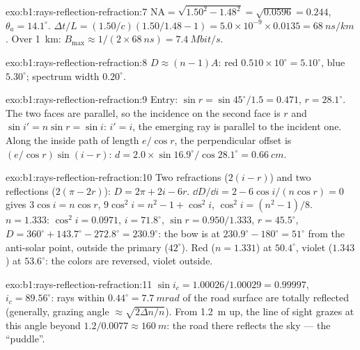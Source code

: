 \begin{solution}{exo:b1:rays-reflection-refraction:7}
$\mathrm{NA} = \sqrt{1.50^2 - 1.48^2} = \sqrt{0.0596} = 0.244$,
$\theta_a = 14.1^\circ$. $\Delta t/L = (1.50/c)(1.50/1.48 - 1) =
5.0\times10^{-9} \times 0.0135 = \qty{68}{ns/km}$. Over \qty{1}{km}:
$B_{\max} \approx 1/(2 \times \qty{68}{ns}) = \qty{7.4}{Mbit/s}$.
\end{solution}

\begin{solution}{exo:b1:rays-reflection-refraction:8}
$D \approx (n - 1)A$: red $0.510 \times 10^\circ = 5.10^\circ$, blue
$5.30^\circ$; spectrum width $0.20^\circ$.
\end{solution}

\begin{solution}{exo:b1:rays-reflection-refraction:9}
Entry: $\sin r = \sin 45^\circ/1.5 = 0.471$, $r = 28.1^\circ$. The two
faces are parallel, so the incidence on the second face is $r$ and
$\sin i' = n\sin r = \sin i$: $i' = i$, the emerging ray is parallel to
the incident one. Along the inside path of length $e/\cos r$, the
perpendicular offset is $(e/\cos r)\sin(i - r)$:
$d = 2.0 \times \sin 16.9^\circ/\cos 28.1^\circ = \qty{0.66}{cm}$.
\end{solution}

\begin{solution}{exo:b1:rays-reflection-refraction:10}
Two refractions ($2(i - r)$) and two reflections ($2(\pi - 2r)$):
$D = 2\pi + 2i - 6r$. $\dd D/\dd i = 2 - 6\cos i/(n\cos r) = 0$ gives
$3\cos i = n\cos r$, $9\cos^2 i = n^2 - 1 + \cos^2 i$, $\cos^2 i =
(n^2 - 1)/8$. $n = 1.333$: $\cos^2 i = 0.0971$, $i = 71.8^\circ$,
$\sin r = 0.950/1.333$, $r = 45.5^\circ$, $D = 360^\circ + 143.7^\circ -
272.8^\circ = 230.9^\circ$: the bow is at $230.9^\circ - 180^\circ =
51^\circ$ from the anti-solar point, outside the primary ($42^\circ$).
Red ($n = 1.331$) at $50.4^\circ$, violet ($1.343$) at $53.6^\circ$:
the colors are reversed, violet outside.
\end{solution}

\begin{solution}{exo:b1:rays-reflection-refraction:11}
$\sin i_c = 1.00026/1.00029 = 0.99997$, $i_c = 89.56^\circ$: rays
within $0.44^\circ = \qty{7.7}{mrad}$ of the road surface are totally
reflected (generally, grazing angle $\approx \sqrt{2\Delta n/n}$). From
\qty{1.2}{m} up, the line of sight grazes at this angle beyond
$1.2/0.0077 \approx \qty{160}{m}$: the road there reflects the sky ---
the ``puddle''.
\end{solution}

